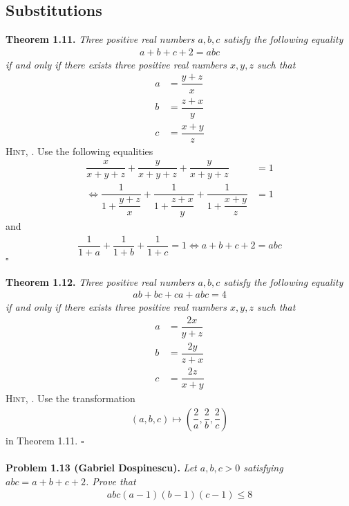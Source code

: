 \documentclass[a4paper,oneside]{article}
\numberwithin{equation}{section}
\begin{document}
\subsection{Substitutions}
\textbf{Theorem 1.11.} \textit{Three positive real numbers $a,b,c$ satisfy the following equality}
\begin{align}
a + b + c + 2 = abc
\end{align}
\textit{if and only if there exists three positive real numbers $x,y,z$ such that}
\begin{align}
a &= \dfrac{{y + z}}{x}\\
b &= \dfrac{{z + x}}{y}\\
c &= \dfrac{{x + y}}{z}
\end{align}
\textsc{Hint, \cite{1}.} Use the following equalities
\begin{align}
\dfrac{x}{{x + y + z}} + \dfrac{y}{{x + y + z}} + \dfrac{y}{{x + y + z}} &= 1\\
 \Leftrightarrow \dfrac{1}{{1 + \dfrac{{y + z}}{x}}} + \dfrac{1}{{1 + \dfrac{{z + x}}{y}}} + \dfrac{1}{{1 + \dfrac{{x + y}}{z}}} &= 1
\end{align}
and 
\begin{align}
\dfrac{1}{{1 + a}} + \dfrac{1}{{1 + b}} + \dfrac{1}{{1 + c}} = 1  \Leftrightarrow a + b + c + 2 = abc 
\end{align}
\hfill $\square$\\
\\
\textbf{Theorem 1.12.} \textit{Three positive real numbers $a,b,c$  satisfy the following equality}
\begin{align}
ab + bc + ca + abc = 4
\end{align}
\textit{if and only if there exists three positive real numbers $x,y,z$ such that}
\begin{align}
a &= \dfrac{{2x}}{{y + z}}\\
b &= \dfrac{{2y}}{{z + x}}\\
c &= \dfrac{{2z}}{{x + y}}
\end{align}
\textsc{Hint, \cite{1}.} Use the transformation
\begin{align}
\left( {a,b,c} \right) \mapsto \left( {\dfrac{2}{a},\dfrac{2}{b},\dfrac{2}{c}} \right)
\end{align}
in Theorem 1.11. \hfill $\square$\\
\\
\textbf{Problem 1.13 (Gabriel Dospinescu).} \textit{Let $a,b,c>0$ satisfying $abc=a+b+c+2$. Prove that}
\begin{align}
abc\left( {a - 1} \right)\left( {b - 1} \right)\left( {c - 1} \right) \le 8
\end{align}
\end{document}
